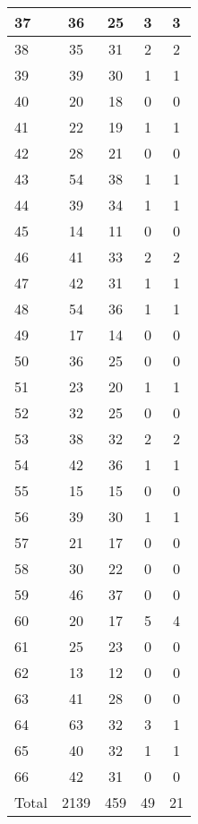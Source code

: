 \begin{center}
\begin{longtable}{l|c|c|c|c}
37 & 36 & 25 & 3 & 3\\ \hline
38 & 35 & 31 & 2 & 2\\ \hline
39 & 39 & 30 & 1 & 1\\ \hline
40 & 20 & 18 & 0 & 0\\ \hline
41 & 22 & 19 & 1 & 1\\ \hline
42 & 28 & 21 & 0 & 0\\ \hline
43 & 54 & 38 & 1 & 1\\ \hline
44 & 39 & 34 & 1 & 1\\ \hline
45 & 14 & 11 & 0 & 0\\ \hline
46 & 41 & 33 & 2 & 2\\ \hline
47 & 42 & 31 & 1 & 1\\ \hline
48 & 54 & 36 & 1 & 1\\ \hline
49 & 17 & 14 & 0 & 0\\ \hline
50 & 36 & 25 & 0 & 0\\ \hline
51 & 23 & 20 & 1 & 1\\ \hline
52 & 32 & 25 & 0 & 0\\ \hline
53 & 38 & 32 & 2 & 2\\ \hline
54 & 42 & 36 & 1 & 1\\ \hline
55 & 15 & 15 & 0 & 0\\ \hline
56 & 39 & 30 & 1 & 1\\ \hline
57 & 21 & 17 & 0 & 0\\ \hline
58 & 30 & 22 & 0 & 0\\ \hline
59 & 46 & 37 & 0 & 0\\ \hline
60 & 20 & 17 & 5 & 4\\ \hline
61 & 25 & 23 & 0 & 0\\ \hline
62 & 13 & 12 & 0 & 0\\ \hline
63 & 41 & 28 & 0 & 0\\ \hline
64 & 63 & 32 & 3 & 1\\ \hline
65 & 40 & 32 & 1 & 1\\ \hline
66 & 42 & 31 & 0 & 0\\ \hline
\hline \hline
Total & 2139 & 459 & 49 & 21



\end{longtable}
\end{center}

 
